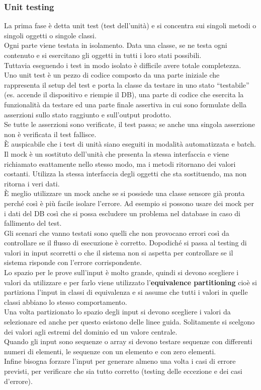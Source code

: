\subsubsection{Unit testing}
La prima fase è detta unit test (test dell'unità) e si concentra sui singoli metodi o singoli oggetti o singole classi.\\
Ogni parte viene testata in isolamento.
Data una classe, se ne testa ogni contenuto e si esercitano gli oggetti in tutti i loro stati possibili.\\
Tuttavia eseguendo i test in modo isolato è difficile avere totale completezza.\\
Uno unit test è un pezzo di codice composto da una parte iniziale che rappresenta il setup del test e porta la classe da testare in uno stato “testabile” (es. accende il dispositivo e riempie il \acrshort{DB}), una parte di codice che esercita la funzionalità da testare ed una parte finale assertiva in cui sono formulate della asserzioni sullo stato raggiunto e sull'output prodotto.\\
Se tutte le asserzioni sono verificate, il test passa; se anche una singola asserzione non è verificata il test fallisce.\\
È auspicabile che i test di unità siano eseguiti in modalità automatizzata e batch.
Il mock è un sostituto dell'unità che presenta la stessa interfaccia e viene richiamato esattamente nello stesso modo, ma i metodi ritornano dei valori costanti.
Utilizza la stessa interfaccia degli oggetti che sta sostituendo, ma non ritorna i veri dati.\\
È meglio utilizzare un mock anche se si possiede una classe sensore già pronta perché così è più facile isolare l'errore.
Ad esempio si possono usare dei mock per i dati del \acrshort{DB} così che si possa escludere un problema nel database in caso di fallimento del test.\\
Gli scenari che vanno testati sono quelli che non provocano errori così da controllare se il flusso di esecuzione è corretto.
Dopodiché si passa al testing di valori in input scorretti o che il sistema non si aspetta per controllare se il sistema risponde con l'errore corrispondente.\\
Lo spazio per le prove sull'input è molto grande, quindi si devono scegliere i valori da utilizzare e per farlo viene utilizzato l'\textbf{equivalence partitioning} cioè si partiziona l'input in classi di equivalenza e si assume che tutti i valori in quelle classi abbiano lo stesso comportamento.\\
Una volta partizionato lo spazio degli input si devono scegliere i valori da selezionare ed anche per questo esistono delle linee guida.
Solitamente si scelgono dei valori agli estremi del dominio ed un valore centrale.\\
Quando gli input sono sequenze o array si devono testare sequenze con differenti numeri di elementi, le sequenze con un elemento e con zero elementi.\\
Infine bisogna forzare l'input per generare almeno una volta i casi di errore previsti, per verificare che sia tutto corretto (testing delle eccezione e dei casi d'errore).

